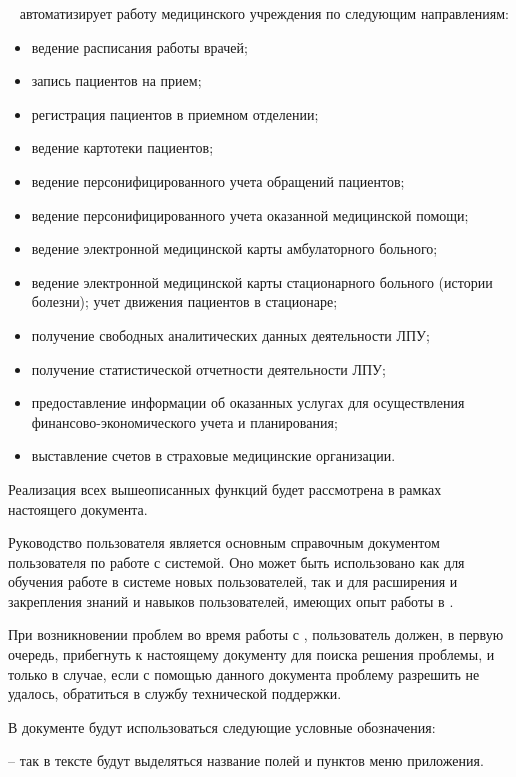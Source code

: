  \tmis~ автоматизирует работу медицинского учреждения по следующим направлениям:
\begin{itemize}
 	\item ведение расписания работы врачей;
 	\item запись пациентов на прием;
 	\item регистрация пациентов в приемном отделении;
 	\item ведение картотеки пациентов;
 	\item ведение персонифицированного учета обращений пациентов;
 	\item ведение персонифицированного учета оказанной медицинской помощи;
 	\item ведение электронной медицинской карты амбулаторного больного;
 	\item ведение электронной медицинской карты стационарного больного (истории болезни);
 	учет движения пациентов в стационаре;
    \item получение свободных аналитических данных деятельности ЛПУ;
 	\item получение статистической отчетности деятельности ЛПУ;
 	\item предоставление информации об оказанных услугах для осуществления финансово-экономического учета и планирования;
 	\item выставление счетов в страховые медицинские организации.
\end{itemize}

Реализация всех вышеописанных функций будет рассмотрена в рамках настоящего документа.

\newpage
{}

 Руководство пользователя является основным справочным документом пользователя по работе с системой. Оно может быть использовано как для обучения работе в системе новых пользователей, так и для расширения и закрепления знаний и навыков пользователей, имеющих опыт работы в \tmis.

 При возникновении проблем во время работы с \tmis, пользователь должен, в первую очередь, прибегнуть к настоящему документу для поиска решения проблемы, и только в случае, если с помощью данного документа проблему разрешить не удалось, обратиться в службу технической поддержки.

 В документе будут использоваться следующие условные обозначения:  \vspace*{0.5em}
 
  -- так в тексте будут выделяться название полей и пунктов меню приложения.
 
